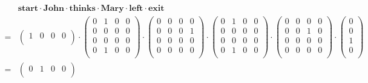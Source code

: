 \begin{align*}
      & \textbf{start} \cdot \textbf{John} \cdot \textbf{thinks} \cdot \textbf{Mary} \cdot \textbf{left} \cdot \textbf{exit}\\
    = & 
        \begin{pmatrix}
            1 & 0 & 0 & 0\\
        \end{pmatrix}
        \cdot
        \begin{pmatrix}
            0 & 1 & 0 & 0\\
            0 & 0 & 0 & 0\\
            0 & 0 & 0 & 0\\
            0 & 1 & 0 & 0\\
        \end{pmatrix}
        \cdot
        \begin{pmatrix}
            0 & 0 & 0 & 0\\
            0 & 0 & 0 & 1\\
            0 & 0 & 0 & 0\\
            0 & 0 & 0 & 0\\
        \end{pmatrix}
        \cdot
        \begin{pmatrix}
            0 & 1 & 0 & 0\\
            0 & 0 & 0 & 0\\
            0 & 0 & 0 & 0\\
            0 & 1 & 0 & 0\\
        \end{pmatrix}
        \cdot
        \begin{pmatrix}
            0 & 0 & 0 & 0\\
            0 & 0 & 1 & 0\\
            0 & 0 & 0 & 0\\
            0 & 0 & 0 & 0\\
        \end{pmatrix}
        \cdot
        \begin{pmatrix}
            0\\
            0\\
            1\\
            0\\
        \end{pmatrix}
        \\
    = & 
        \begin{pmatrix}
            0 & 1 & 0 & 0\\

\end{pmatrix}
\end{align*}
